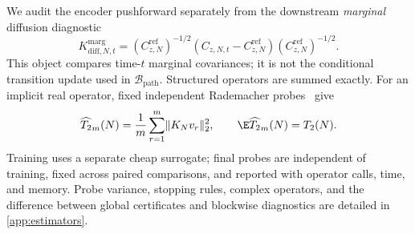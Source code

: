 We audit the encoder pushforward separately from the downstream
\emph{marginal} diffusion diagnostic
\begin{equation}
  K^{\mathrm{marg}}_{\mathrm{diff},N,t}
  =(C_{z,N}^{\mathrm{ref}})^{-1/2}
    (C_{z,N,t}-C_{z,N}^{\mathrm{ref}})
   (C_{z,N}^{\mathrm{ref}})^{-1/2}.
  \label{eq:diffusion-relative-covariance}
\end{equation}
This object compares time-$t$ marginal covariances; it is not the conditional
transition update used in $\mathcal B_{\mathrm{path}}$.
Structured operators are summed exactly. For an implicit real operator, fixed
independent Rademacher probes~\citep{hutchinson1989stochastic} give
\begin{equation}
  \widehat\Ttwo_m(N)
  =\frac1m\sum_{r=1}^m\lVert K_Nv_r\rVert_2^2,
  \qquad \E\widehat\Ttwo_m(N)=\Ttwo(N).
  \label{eq:matrix-free-t2}
\end{equation}
Training uses a separate cheap surrogate; final probes are independent of
training, fixed across paired comparisons, and reported with operator calls,
time, and memory. Probe variance, stopping rules, complex operators, and the
difference between global certificates and blockwise diagnostics are detailed
in \cref{app:estimators}.
